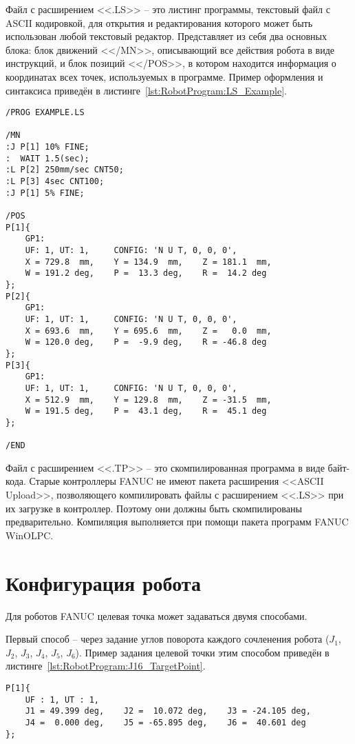 Файл с расширением <<.LS>> -- это листинг программы, текстовый файл с ASCII кодировкой, для открытия и редактирования которого может быть использован любой текстовый редактор.
Представляет из себя два основных блока: блок движений <</MN>>, описывающий все действия робота в виде инструкций, и блок позиций <</POS>>, в котором находится информация о координатах всех точек, используемых в программе.
Пример оформления и синтаксиса приведён в листинге~\ref{lst:RobotProgram:LS_Example}.

\begin{lstlisting}[caption={Пример оформления .LS файлов}, label={lst:RobotProgram:LS_Example}]
/PROG EXAMPLE.LS

/MN
:J P[1] 10% FINE;
:  WAIT 1.5(sec);
:L P[2] 250mm/sec CNT50;
:L P[3] 4sec CNT100;
:J P[1] 5% FINE;

/POS
P[1]{
    GP1:
    UF: 1, UT: 1,     CONFIG: 'N U T, 0, 0, 0',
    X = 729.8  mm,    Y = 134.9  mm,    Z = 181.1  mm,
    W = 191.2 deg,    P =  13.3 deg,    R =  14.2 deg
};
P[2]{
    GP1:
    UF: 1, UT: 1,     CONFIG: 'N U T, 0, 0, 0',
    X = 693.6  mm,    Y = 695.6  mm,    Z =   0.0  mm,
    W = 120.0 deg,    P =  -9.9 deg,    R = -46.8 deg
};
P[3]{
    GP1:
    UF: 1, UT: 1,     CONFIG: 'N U T, 0, 0, 0',
    X = 512.9  mm,    Y = 129.8  mm,    Z = -31.5  mm,
    W = 191.5 deg,    P =  43.1 deg,    R =  45.1 deg
};

/END
\end{lstlisting}

Файл с расширением <<.TP>> -- это скомпилированная программа в виде байт-кода.
Старые контроллеры FANUC не имеют пакета расширения <<ASCII Upload>>, позволяющего компилировать файлы с расширением <<.LS>> при их загрузке в контроллер.
Поэтому они должны быть скомпилированы предварительно.
Компиляция выполняется при помощи пакета программ FANUC WinOLPC.


\section{Конфигурация робота} \label{sec:RobotConfiguration}
Для роботов FANUC целевая точка может задаваться двумя способами.

Первый способ -- через задание углов поворота каждого сочленения робота ($J_1$, $J_2$, $J_3$, $J_4$, $J_5$, $J_6$).
Пример задания целевой точки этим способом приведён в листинге~\ref{lst:RobotProgram:J16_TargetPoint}.

\begin{lstlisting}[caption={Задание целевой точки с помощью углов J1-J6}, label={lst:RobotProgram:J16_TargetPoint}]
P[1]{
    UF : 1, UT : 1,
    J1 = 49.399 deg,    J2 =  10.072 deg,    J3 = -24.105 deg,
    J4 =  0.000 deg,    J5 = -65.895 deg,    J6 =  40.601 deg
};
\end{lstlisting}

